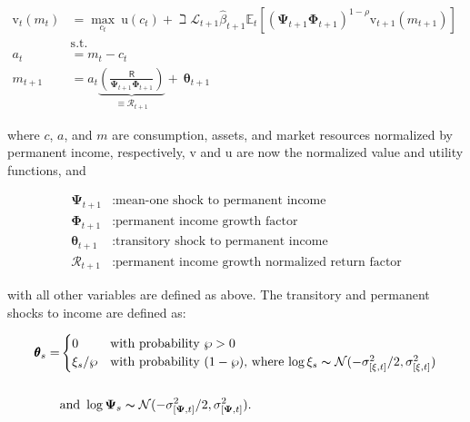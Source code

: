 \documentclass{article}
\newcommand{\DiscFac}{\beta}
\newcommand{\uFunc}{\mathrm{u}}
\newcommand{\vFunc}{\mathrm{v}}
\newcommand{\Alive}{\mathcal{L}}
\newcommand{\Ex}{\mathbb{E}}
\newcommand{\CRRA}{\rho}
\newcommand{\PermGroFac}{\pmb{\Phi}}
\newcommand{\Rfree}{\mathsf{R}}
\newcommand{\PermShk}{\mathbf{\Psi}}
\newcommand{\aNrm}{a}
\newcommand{\cNrm}{c}
\newcommand{\RNrm}{\mathcal{R}}
\newcommand{\TranShkEmp}{\pmb{\theta}}
\newcommand{\mNrm}{m}
\newcommand{\pZero}{\wp}
\begin{document}
\begin{equation}
\begin{align}
    {\vFunc}_{t}({m}_{t}) & = \max_{\cNrm_{t}} ~ \uFunc(\cNrm_{t})+\beth\Alive_{t+1}\hat{\DiscFac}_{t+1}
    \Ex_{t}[(\PermShk_{t+1}\PermGroFac_{t+1})^{1-\CRRA}{\vFunc}_{t+1}({m}_{t+1})]
    \\ & \text{s.t.} &
    \\ \aNrm_{t} & = {m}_{t}-\cNrm_{t}
    \\ {m}_{t+1} & = \aNrm_{t}\underbrace{\left(\frac{\Rfree}{\PermShk_{t+1}\PermGroFac_{t+1}}\right)}_{\equiv \RNrm_{t+1}}
    + ~\TranShkEmp_{t+1}
\end{align}
\end{equation}

where $\cNrm$, $\aNrm$, and $\mNrm$ are consumption, assets, and market resources normalized by permanent income, respectively, $\vFunc$ and $\uFunc$ are now the normalized value and utility functions,  and

\begin{equation}
\begin{align}
  \PermShk_{t+1} & :  \text{mean-one shock to permanent income}
    \\ \PermGroFac_{t+1} & :  \text{permanent income growth factor}
    \\ \TranShkEmp_{t+1} & :  \text{transitory shock to permanent income}
    \\ \RNrm_{t+1} & :  \text{permanent income growth normalized return factor}
\end{align}
\end{equation}

with all other variables are defined as above. The transitory and permanent shocks to income are defined as:

\begin{equation}
\begin{align}
\TranShkEmp_{s}  = &
    \begin{cases}
        0\phantom{/\pZero} & \text{with probability $\pZero>0$}
        \\ \xi_{s}/\pZero & \text{with probability $(1-\pZero)$, where
            $\log \xi_{s}\thicksim \mathcal{N}(-\sigma_{[\xi, t]}^{2}/2,\sigma_{[\xi, t]}^{2})$}
    \end{cases}
    \\ \phantom{/\pZero} \\ & \text{and }  \log \PermShk_{s}   \thicksim \mathcal{N}(-\sigma_{[\PermShk, t]}^{2}/2,\sigma_{[\PermShk, t]}^{2}).
  \end{align}
\end{equation}
\end{document}
